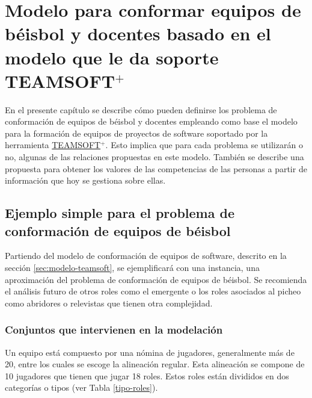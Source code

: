 \chapter{Modelo para conformar equipos de béisbol y docentes basado en el modelo que le da soporte TEAMSOFT$^+$}\label{chap:2}

En el presente capítulo se describe cómo pueden definirse los problema de conformación de equipos de béisbol y docentes empleando como base el modelo para la formación de equipos de proyectos de software soportado por la herramienta \hyperref[sec:modelo-teamsoft]{TEAMSOFT$^+.$} Esto implica que para cada problema se utilizarán o no, algunas de las relaciones propuestas en este modelo. También se describe una propuesta para obtener los valores de las competencias de las personas a partir de información que hoy se gestiona sobre ellas.

\section{Ejemplo simple para el problema de conformación de equipos de béisbol}\label{ejemplo-pel}

Partiendo del modelo de conformación de equipos de software, descrito en la sección \ref{sec:modelo-teamsoft}, se ejemplificará con una instancia, una aproximación del problema de conformación de equipos de béisbol. Se recomienda el análisis futuro de otros roles como el emergente o los roles asociados al picheo como abridores o relevistas que tienen otra complejidad.

\subsection{Conjuntos que intervienen en la modelación}\label{sec:conjuntos}
Un equipo está compuesto por una nómina de jugadores, generalmente más de 20, entre los cuales se escoge la alineación regular. Esta alineación se compone de 10 jugadores que tienen que jugar 18 roles. Estos roles están divididos en dos categorías o tipos (ver Tabla \ref{tipo-roles}).

